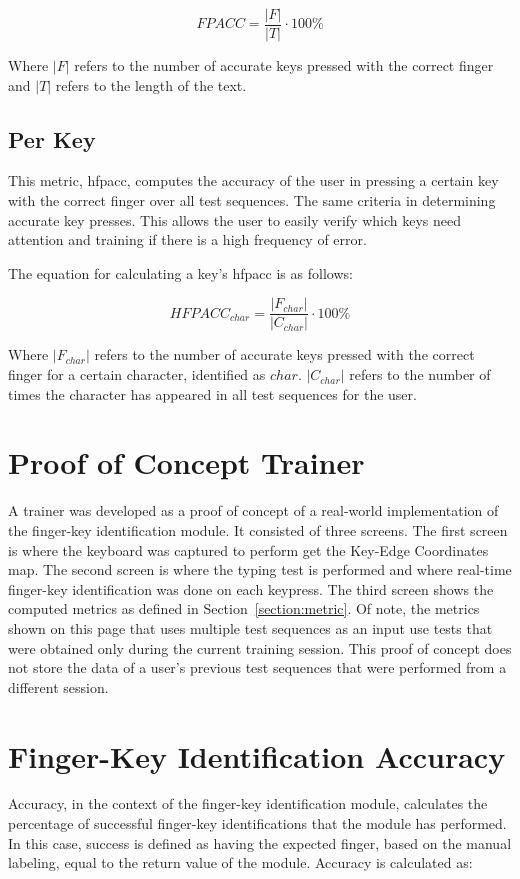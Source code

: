 \documentclass[preprint,12pt,authoryear]{elsarticle}
\begin{document}
\begin{equation}
	FP ACC = \frac{|F|}{|T|} \cdot 100\%
\end{equation}


Where $|F|$ refers to the number of accurate keys pressed with the
correct finger and $|T|$ refers to the length of the text.

\subsection{Per Key}
This metric, \ac{hfpacc}, computes the accuracy of the user in pressing a
certain key with the correct finger over all test sequences. The same criteria
in determining accurate key presses. This allows the user to easily verify which
keys need attention and training if there is a high frequency of error.

The equation for calculating a key's \ac{hfpacc} is as follows:

\begin{equation}
	HFP ACC_{char} = \frac{|F_{char}|}{|C_{char}|} \cdot 100\%
\end{equation}

Where $|F_{char}|$ refers to the number of accurate keys pressed with the
correct finger for a certain character, identified as $char$. $|C_{char}|$
refers to the number of times the character has appeared in all test sequences
for the user.

\section{Proof of Concept Trainer}
A trainer was developed as a proof of concept of a real-world implementation of
the finger-key identification module. It consisted of three screens. The first
screen is where the keyboard was captured to perform get the Key-Edge
Coordinates map. The second screen is where the typing test is performed and
where real-time finger-key identification was done on each keypress. The third
screen shows the computed metrics as defined in Section~\ref{section:metric}. Of
note, the metrics shown on this page that uses multiple test sequences as an
input use tests that were obtained only during the current training session.
This proof of concept does not store the data of a user's previous test
sequences that were performed from a different session.

\section{Finger-Key Identification Accuracy}
Accuracy, in the context of the finger-key identification module, calculates the
percentage of successful finger-key identifications that the module has
performed. In this case, success is defined as having the expected finger, based
on the manual labeling, equal to the return value of the module. Accuracy is
calculated as:
\end{document}
